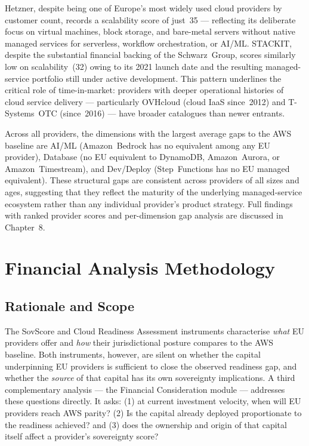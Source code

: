 Hetzner, despite being one of Europe's most widely used cloud providers by customer count, records a scalability score of just~35 — reflecting its deliberate focus on virtual machines, block storage, and bare-metal servers without native managed services for serverless, workflow orchestration, or AI/ML. STACKIT, despite the substantial financial backing of the Schwarz~Group, scores similarly low on scalability~(32) owing to its 2021 launch date and the resulting managed-service portfolio still under active development. This pattern underlines the critical role of time-in-market: providers with deeper operational histories of cloud service delivery — particularly OVHcloud (cloud IaaS since~2012) and T-Systems~OTC (since~2016) — have broader catalogues than newer entrants.

Across all providers, the dimensions with the largest average gaps to the AWS baseline are AI/ML (Amazon~Bedrock has no equivalent among any EU provider), Database (no EU equivalent to DynamoDB, Amazon~Aurora, or Amazon~Timestream), and Dev/Deploy (Step~Functions has no EU managed equivalent). These structural gaps are consistent across providers of all sizes and ages, suggesting that they reflect the maturity of the underlying managed-service ecosystem rather than any individual provider's product strategy. Full findings with ranked provider scores and per-dimension gap analysis are discussed in Chapter~8.

\section{Financial Analysis Methodology}
\label{sec:financial_methodology}

\subsection{Rationale and Scope}
\label{subsec:financial_rationale}

The SovScore and Cloud Readiness Assessment instruments characterise \emph{what} EU providers offer and \emph{how} their jurisdictional posture compares to the AWS baseline. Both instruments, however, are silent on whether the capital underpinning EU providers is sufficient to close the observed readiness gap, and whether the \emph{source} of that capital has its own sovereignty implications. A third complementary analysis --- the Financial Consideration module --- addresses these questions directly. It asks: (1) at current investment velocity, when will EU providers reach AWS parity? (2) Is the capital already deployed proportionate to the readiness achieved? and (3) does the ownership and origin of that capital itself affect a provider's sovereignty score?

